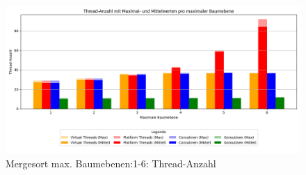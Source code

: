 \documentclass[fontsize=12pt,paper=a4,twoside=semi,parskip=half-,headsepline,headinclude]{scrreprt}
\begin{document}
\begin{figure}[H]
	\centering
	\includegraphics[scale=0.5]{figures/mergesort/Maximalebauebenen1-6/num_threads_bar_plot.png}
	\caption{Mergesort max. Baumebenen:1-6: Thread-Anzahl}
	\label{fig:ms1-6Threads}
\end{figure}
\end{document}

